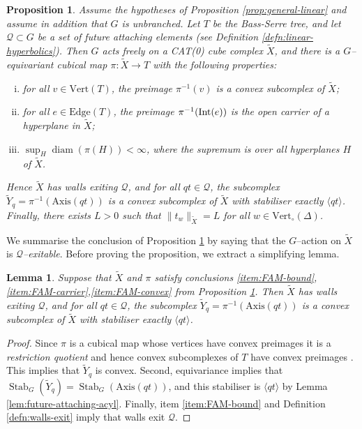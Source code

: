 \documentclass[11pt,oneside]{amsart}
\newcounter{ax}
\newtheorem{lem}[thm]{Lemma}
\newtheorem{prop}[thm]{Proposition}
\theoremstyle{definition}
\DeclareMathOperator{\stabilizer}{Stab}
\DeclareMathOperator{\diam}{diam}
\newcommand{\interior} [1] {{\ensuremath \text{\rm Int}(#1) }}
\newcommand{\vertices}{\mathrm{Vert}}
\newcommand{\edges}{\mathrm{Edge}}
\newcommand{\axis}{\mathrm{Axis}}
\begin{document}
\begin{prop}\label{prop:exit-arrangement}
Assume the hypotheses of Proposition \ref{prop:general-linear} and assume in addition that $G$ is unbranched.  Let $T$ be the Bass-Serre tree, and let $\mathcal Q\subset G$ be a set of future attaching elements (see Definition \ref{defn:linear-hyperbolics}).  Then $G$ acts freely on a CAT(0) cube complex $\widetilde X$, and there is a $G$--equivariant cubical map $\pi:\widetilde X\to T$ with the following properties:
\begin{enumerate}[(i)]
    \item \label{item:FAM-convex} for all $v\in\vertices(T)$, the preimage $\pi^{-1}(v)$ is a convex subcomplex of $\widetilde X$;
    \item \label{item:FAM-carrier} for all $e\in\edges(T)$, the preimage $\pi^{-1}(\interior e)$ is the open carrier of a hyperplane in $\widetilde X$;
    \item \label{item:FAM-bound} $\sup_H\diam(\pi(H))<\infty$, where the supremum is over all hyperplanes $H$ of $\widetilde X$.
\end{enumerate}
Hence $\widetilde X$ has walls exiting $\mathcal Q$, and for all $qt\in\mathcal Q$, the subcomplex $\widetilde Y_q=\pi^{-1}(\axis(qt))$ is a convex subcomplex of $\widetilde X$ with stabiliser exactly $\langle qt\rangle$.  Finally, there exists $L>0$ such that $\|t_w\|_{\widetilde X}=L$ for all $w\in\vertices_\circ(\Delta)$.
\end{prop}

We summarise the conclusion of Proposition \ref{prop:exit-arrangement} by saying that the $G$--action on $\widetilde X$ is \emph{$\mathcal Q$--exitable}.  Before proving the proposition, we extract a simplifying lemma.

\begin{lem}\label{lem:exit-simplify}
Suppose that $\widetilde X$ and $\pi$ satisfy conclusions \eqref{item:FAM-bound},\eqref{item:FAM-carrier},\eqref{item:FAM-convex} from Proposition \ref{prop:exit-arrangement}.  Then $\widetilde X$ has walls exiting $\mathcal Q$, and for all $qt\in\mathcal Q$, the subcomplex $\widetilde Y_q=\pi^{-1}(\axis(qt))$ is a convex subcomplex of $\widetilde X$ with stabiliser exactly $\langle qt\rangle$.
\end{lem}

\begin{proof}
Since $\pi$ is a cubical map whose vertices have convex preimages it is a \emph{restriction quotient} and hence convex subcomplexes of $T$ have convex preimages \cite{HuangKleiner}.  This implies that $\widetilde Y_q$ is convex.  Second, equivariance implies that $\stabilizer_G(\widetilde Y_q)=\stabilizer_G(\axis(qt))$, and this stabiliser is $\langle qt\rangle$ by Lemma \ref{lem:future-attaching-acyl}.  Finally, item \eqref{item:FAM-bound} and Definition \ref{defn:walls-exit} imply that walls exit $\mathcal Q$.
\end{proof}
\end{document}
